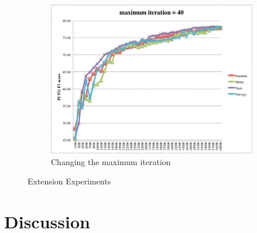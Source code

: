 \documentclass[winfonts,UTF8]{article}
\begin{document}
\begin{enumerate}
\begin{figure}[!htbp]
\begin{subfigure}[b]{0.45\textwidth}
\includegraphics[width=\textwidth]{res5.pdf}
\caption{Changing the maximum iteration}
\label{fig:res_ext3}
\end{subfigure}
\caption{Extension Experiments}
\label{fig:res}
\end{figure}


\end{enumerate}
\section{Discussion}
\end{document}
